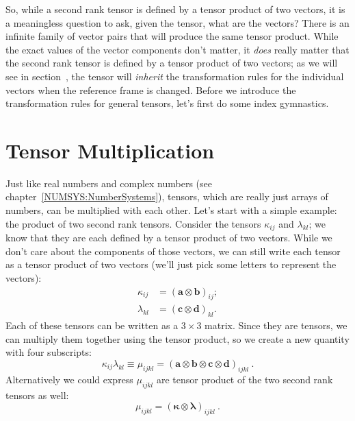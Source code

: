 So, while a second rank tensor is defined by a tensor product of two vectors, it is a meaningless question to  ask, given the tensor, what are the vectors?  There is an infinite family of vector pairs that will produce the same tensor product.  While the exact values of the vector components don't matter, it \textit{does} really matter that the second rank tensor is defined by a tensor product of two vectors; as we will see in section~, the tensor will \textit{inherit} the transformation rules for the individual vectors when the reference frame is changed.   Before we introduce the transformation rules for general tensors, let's first do some index gymnastics.


\section{Tensor Multiplication}
Just like real numbers and complex numbers (see chapter~\ref{NUMSYS:NumberSystems}), tensors, which are really just arrays of numbers, can be multiplied with each other.  Let's start with a simple example: the product of two second rank tensors. Consider the tensors $\kappa_{ij}$ and $\lambda_{kl}$; we know that they are each defined by a tensor product of two vectors.  While we don't care about the components of those vectors, we can still write each tensor as a tensor product of two vectors (we'll just pick some letters to represent the vectors):
\begin{equation}
	\begin{split}
		\kappa_{ij} & = (\mathbf{a}\otimes\mathbf{b})_{ij};\\
		\lambda_{kl} & = (\mathbf{c}\otimes\mathbf{d})_{kl}.
	\end{split}
\end{equation}
Each of these tensors can be written as a $3\times 3$ matrix.  Since they are tensors, we can multiply them together using the tensor product, so we create a new quantity with four subscripts:
\begin{equation}
	\kappa_{ij}\lambda_{kl} \equiv \mu_{ijkl} =  (\mathbf{a}\otimes\mathbf{b}\otimes\mathbf{c}\otimes\mathbf{d})_{ijkl}\ .
\end{equation}
Alternatively we could express $\mu_{ijkl}$ are tensor product of the two second rank tensors as well:
\begin{equation}
	\mu_{ijkl} =  (\bm{\kappa}\otimes\bm{\lambda})_{ijkl}\ .
\end{equation}
